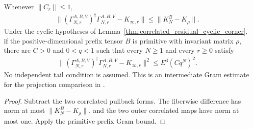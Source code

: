 \begin{lemma}
    \label{thm:correlated_residual_gram_error}
    \leanok
    Whenever $\|C_r\|\leq1$,
    \begin{align}
        \|(\Gamma_{N,r}^{A,B,V})^\dagger\Gamma_{N,r}^{A,B,V}-K_{\infty,r}\|
        \leq\|K_N^B-K_\rho\|.
    \end{align}
    Under the cyclic hypotheses of
    Lemma~\ref{thm:correlated_residual_cyclic_corner}, if the positive-dimensional
    prefix tensor $B$ is primitive with invariant matrix $\rho$, there are
    $C>0$ and $0<q<1$ such that every $N\geq1$ and every $r\geq0$ satisfy
    \begin{align}
        \|(\Gamma_{N,r}^{A,B,V})^\dagger\Gamma_{N,r}^{A,B,V}-K_{\infty,r}\|^2
        \leq E^3(Cq^N)^2.
    \end{align}
    No independent tail condition is assumed. This is an intermediate Gram
    estimate for the projection comparison in
    \cite[Lemma~commutation(i), lines~2442--2531]{Nachtergaele1996Spectral}.
\end{lemma}
\begin{proof}\leanok
    Subtract the two correlated pullback forms. The fiberwise difference has
    norm at most $\|K_N^B-K_\rho\|$, and the two outer correlated maps
    have norm at most one. Apply the primitive prefix Gram bound.
\end{proof}

